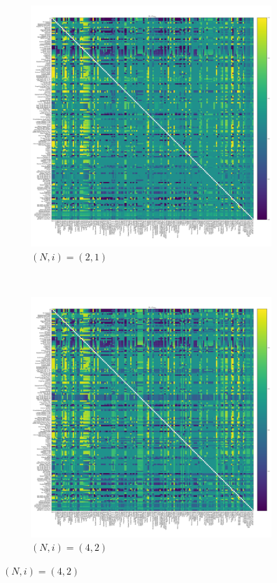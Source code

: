 \documentclass{article}
\begin{document}
\begin{figure}[!hbtp]
    \centering
    \begin{subfigure}[t]{.3\textwidth}
        \centering
        \includegraphics[width=.8\textwidth]{../img/fixation_heatmap_2_coexist.pdf}
        \caption{\((N,i)=(2, 1)\)}
    \end{subfigure}%
    ~
    \begin{subfigure}[t]{.3\textwidth}
        \centering
        \includegraphics[width=.8\textwidth]{../img/fixation_heatmap_4_coexist.pdf}
        \caption{\((N,i)=(4, 2)\)}
    \end{subfigure}%

\end{figure}
\end{document}
